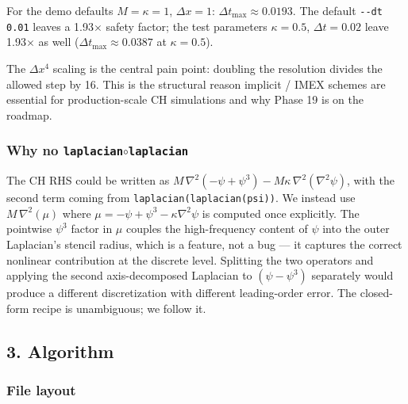 For the demo defaults \(M=\kappa=1\), \(\Delta x=1\):
\(\Delta t_{\max}\approx 0.0193\). The default
\passthrough{\lstinline!--dt 0.01!} leaves a 1.93\(\times\) safety
factor; the test parameters \(\kappa=0.5\), \(\Delta t=0.02\) leave
1.93\(\times\) as well (\(\Delta t_{\max} \approx 0.0387\) at
\(\kappa=0.5\)).

The \(\Delta x^4\) scaling is the central pain point: doubling the
resolution divides the allowed step by 16. This is the structural
reason implicit / IMEX schemes are essential for production-scale CH
simulations and why Phase 19 is on the roadmap.

\subsubsection{Why no \texttt{laplacian}\(\circ\)\texttt{laplacian}}\label{phase12-no-direct}

The CH RHS could be written as
\(M\,\nabla^2(-\psi + \psi^3) - M\kappa\,\nabla^2(\nabla^2\psi)\), with
the second term coming from
\passthrough{\lstinline!laplacian(laplacian(psi))!}. We instead use
\(M\,\nabla^2(\mu)\) where
\(\mu = -\psi + \psi^3 - \kappa\nabla^2\psi\) is computed once
explicitly. The pointwise \(\psi^3\) factor in \(\mu\) couples the
high-frequency content of \(\psi\) into the outer Laplacian's
stencil radius, which is a feature, not a bug --- it captures the
correct nonlinear contribution at the discrete level. Splitting the
two operators and applying the second axis-decomposed Laplacian to
\((\psi - \psi^3)\) separately would produce a different
discretization with different leading-order error. The closed-form
recipe is unambiguous; we follow it.

\subsection{3. Algorithm}\label{phase12-algorithm}

\subsubsection{File layout}\label{phase12-files}

